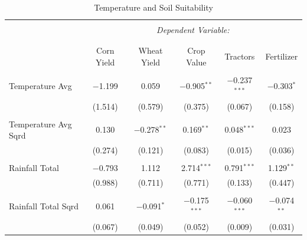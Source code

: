 \documentclass[12pt]{article}
\begin{document}
\begin{appendices}
    \begin{table}[!htbp] \centering 
        \caption{Temperature and Soil Suitability} 
        \label{covar_temp} 
        \begin{threeparttable}[t]
        \footnotesize
      \begin{tabular}{@{\extracolsep{5pt}}lccccc} 
      \\[-1.8ex]\hline 
      \hline \\[-1.8ex] 
       & \multicolumn{5}{c}{\textit{Dependent Variable:}} \\ 
      \cline{2-6} 
      \\[-1.8ex] 
      &            &             &            &          &            \\
      & Corn Yield & Wheat Yield & Crop Value & Tractors & Fertilizer \\ 
      \hline \\[-1.8ex] 
    Temperature Avg     &  $-$1.199        & 0.059           & $-$0.905$^{**}$ & $-$0.237$^{***}$& $-$0.303$^{*}$ \\
                        &  (1.514)         & (0.579)         & (0.375)         & (0.067)         & (0.158)        \\
                        &                  &                 &                 &                 &                \\
    Temperature Avg Sqrd&  0.130           & $-$0.278$^{**}$ & 0.169$^{**}$    & 0.048$^{***}$   & 0.023          \\
                        &  (0.274)         & (0.121)         & (0.083)         & (0.015)         & (0.036)        \\
                        &                  &                 &                 &                 &                \\
    Rainfall Total          &  $-$0.793        & 1.112           & 2.714$^{***}$   & 0.791$^{***}$   & 1.129$^{**}$   \\
                        &  (0.988)         & (0.711)         & (0.771)         & (0.133)         & (0.447)        \\
                        &                  &                 &                 &                 &                \\
    Rainfall Total Sqrd     &  0.061           & $-$0.091$^{*}$  & $-$0.175$^{***}$& $-$0.060$^{***}$& $-$0.074$^{**}$\\
                        &  (0.067)         & (0.049)         & (0.052)         & (0.009)         & (0.031)        \\

\end{tabular}
\end{threeparttable}
\end{table}
\end{appendices}
\end{document}
